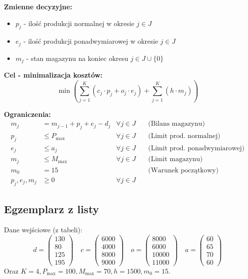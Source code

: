 \documentclass[11pt, a4paper]{article}
\begin{document}
\noindent \textbf{Zmienne decyzyjne:}
\begin{itemize}
    \item $p_j$ - ilość produkcji normalnej w okresie $j \in J$
    \item $e_j$ - ilość produkcji ponadwymiarowej w okresie $j \in J$
    \item $m_j$ - stan magazynu na koniec okresu $j \in J \cup \{0\}$
\end{itemize}

\noindent \textbf{Cel - minimalizacja kosztów:}
$$ \min \left( \sum_{j=1}^{K} (c_j \cdot p_j + o_j \cdot e_j) + \sum_{j=1}^{K} (h \cdot m_j) \right) $$

\noindent \textbf{Ograniczenia:}
\begin{align*}
    m_j &= m_{j-1} + p_j + e_j - d_j & \forall j \in J \quad &\text{(Bilans magazynu)} \\
    p_j &\le P_{\max} & \forall j \in J \quad &\text{(Limit prod. normalnej)} \\
    e_j &\le a_j & \forall j \in J \quad &\text{(Limit prod. ponadwymiarowej)} \\
    m_j &\le M_{\max} & \forall j \in J \quad &\text{(Limit magazynu)} \\
    m_0 &= 15 & \quad &\text{(Warunek początkowy)} \\
    p_j, e_j, m_j &\ge 0 & \forall j \in J &
\end{align*}

\subsection{Egzemplarz z listy}
Dane wejściowe (z tabeli):
$$ d = \begin{pmatrix} 130 \\ 80 \\ 125 \\ 195 \end{pmatrix} \quad
   c = \begin{pmatrix} 6000 \\ 4000 \\ 8000 \\ 9000 \end{pmatrix} \quad
   o = \begin{pmatrix} 8000 \\ 6000 \\ 10000 \\ 11000 \end{pmatrix} \quad
   a = \begin{pmatrix} 60 \\ 65 \\ 70 \\ 60 \end{pmatrix}
$$
Oraz $K=4, P_{\max}=100, M_{\max}=70, h=1500, m_0=15$.
\end{document}
